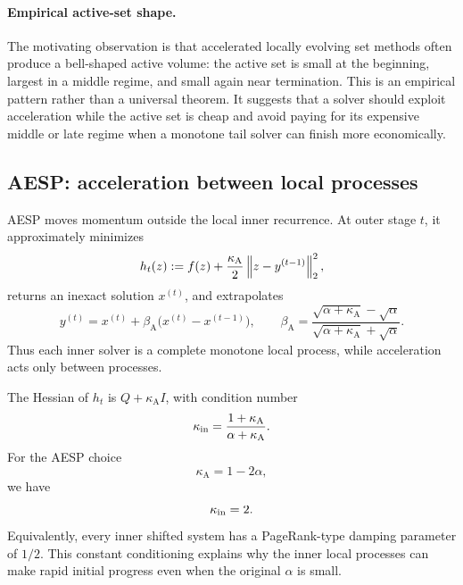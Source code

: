 \paragraph{Empirical active-set shape.}
The motivating observation is that accelerated locally evolving set methods
often produce a bell-shaped active volume: the active set is small at the
beginning, largest in a middle regime, and small again near termination.  This
is an empirical pattern rather than a universal theorem.  It suggests that a
solver should exploit acceleration while the active set is cheap and avoid
paying for its expensive middle or late regime when a monotone tail solver can
finish more economically.

\subsection{AESP: acceleration between local processes}

AESP moves momentum outside the local inner recurrence.  At outer stage
\(t\), it approximately minimizes
\begin{equation}
    h_t(z)
    :=f(z)+\frac{\kappa_{\mathrm A}}{2}\left\lVert z-y^{(t-1)}\right\rVert_2^2,
    \label{eq:aesp-prox-objective}
\end{equation}
returns an inexact solution \(x^{(t)}\), and extrapolates
\begin{equation}
    y^{(t)}
    =x^{(t)}
     +\beta_{\mathrm A}\bigl(x^{(t)}-x^{(t-1)}\bigr),
    \qquad
    \beta_{\mathrm A}
    =\frac{\sqrt{\alpha+\kappa_{\mathrm A}}-\sqrt\alpha}
           {\sqrt{\alpha+\kappa_{\mathrm A}}+\sqrt\alpha}.
    \label{eq:aesp-momentum}
\end{equation}
Thus each inner solver is a complete monotone local process, while acceleration
acts only between processes.

The Hessian of \(h_t\) is \(Q+\kappa_{\mathrm A} I\), with condition number
\begin{equation}
    \kappa_{\rm in}
    =\frac{1+\kappa_{\mathrm A}}{\alpha+\kappa_{\mathrm A}}.
    \label{eq:inner-condition}
\end{equation}
For the AESP choice
\begin{equation}
    \kappa_{\mathrm A}=1-2\alpha,
    \label{eq:aesp-kappa}
\end{equation}
we have
\begin{equation}
    \kappa_{\rm in}=2.
    \label{eq:inner-condition-two}
\end{equation}
Equivalently, every inner shifted system has a PageRank-type damping parameter
of \(1/2\).  This constant conditioning explains why the inner local processes
can make rapid initial progress even when the original \(\alpha\) is small.


